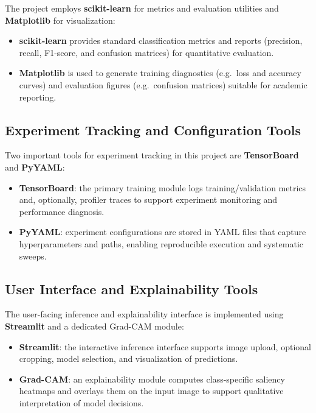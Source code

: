 The project employs \textbf{scikit-learn} for metrics and evaluation utilities and \textbf{Matplotlib} for visualization:
\begin{itemize}
  \item \textbf{scikit-learn} provides standard classification metrics and reports (precision, recall, F1-score, and confusion matrices) for quantitative evaluation.
  \item \textbf{Matplotlib} is used to generate training diagnostics (e.g.\ loss and accuracy curves) and evaluation figures (e.g.\ confusion matrices) suitable for academic reporting.
\end{itemize}

\subsection{Experiment Tracking and Configuration Tools}

Two important tools for experiment tracking in this project are \textbf{TensorBoard} and \textbf{PyYAML}:
\begin{itemize}
  \item \textbf{TensorBoard}: the primary training module logs training/validation metrics and, optionally, profiler traces to support experiment monitoring and performance diagnosis.
  \item \textbf{PyYAML}: experiment configurations are stored in YAML files that capture hyperparameters and paths, enabling reproducible execution and systematic sweeps.
\end{itemize}

\subsection{User Interface and Explainability Tools}

The user-facing inference and explainability interface is implemented using \textbf{Streamlit} and a dedicated Grad-CAM module:
\begin{itemize}
  \item \textbf{Streamlit}: the interactive inference interface supports image upload, optional cropping, model selection, and visualization of predictions.
  \item \textbf{Grad-CAM}: an explainability module computes class-specific saliency heatmaps and overlays them on the input image to support qualitative interpretation of model decisions.
\end{itemize}

